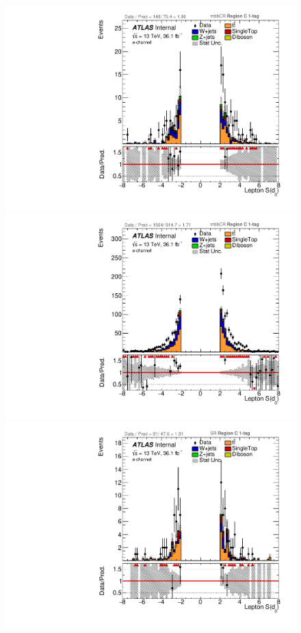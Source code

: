 \begin{figure}[!htbp]
\begin{center}
\includegraphics[scale=0.33]{./figures/boosted/ABCD/elec_mbbcr_RegionC_Lep_d0sigL}        
\includegraphics[scale=0.33]{./figures/boosted/ABCD/elec_mbbcr_RegionC_1tag_Lep_d0sigL}  \\
\includegraphics[scale=0.33]{./figures/boosted/ABCD/elec_SR_RegionC_Lep_d0sigL}         

\end{center}
\end{figure}
